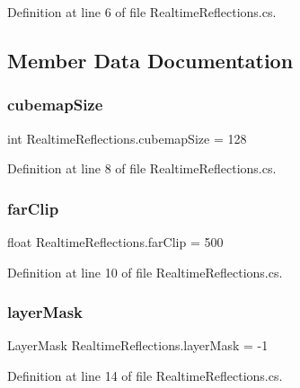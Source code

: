 Definition at line 6 of file Realtime\+Reflections.\+cs.



\subsection{Member Data Documentation}
\mbox{\label{class_realtime_reflections_a4630c8d321236e50251778c8e527e684}} 
\subsubsection{\texorpdfstring{cubemap\+Size}{cubemapSize}}
{\footnotesize\ttfamily int Realtime\+Reflections.\+cubemap\+Size = 128}



Definition at line 8 of file Realtime\+Reflections.\+cs.

\mbox{\label{class_realtime_reflections_a8a0451b3ec0d3e12ef0f4661b10f3263}} 
\subsubsection{\texorpdfstring{far\+Clip}{farClip}}
{\footnotesize\ttfamily float Realtime\+Reflections.\+far\+Clip = 500}



Definition at line 10 of file Realtime\+Reflections.\+cs.

\mbox{\label{class_realtime_reflections_a2a44b6a6be9de741c64e83b04ff98604}} 
\subsubsection{\texorpdfstring{layer\+Mask}{layerMask}}
{\footnotesize\ttfamily Layer\+Mask Realtime\+Reflections.\+layer\+Mask = -\/1}



Definition at line 14 of file Realtime\+Reflections.\+cs.

